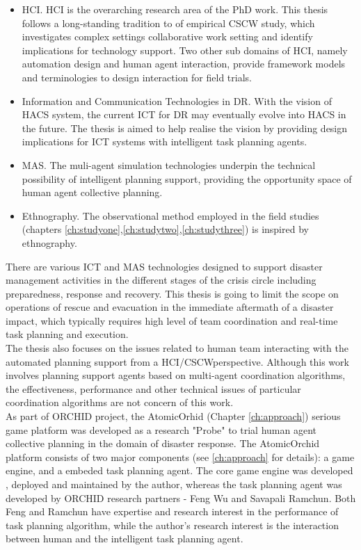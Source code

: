 \begin{itemize} 
  \item \acf{HCI}. \ac{HCI} is the overarching research area of the PhD work. This thesis follows a long-standing tradition to of empirical \ac{CSCW} study, which investigates complex settings collaborative work setting and identify implications for technology support. Two other sub domains of \ac{HCI}, namely automation design and human agent interaction, provide framework models and terminologies to design interaction for field trials.
  \item Information and Communication Technologies in DR. With the vision of \ac{HACS} system, the current ICT for DR may eventually evolve into \ac{HACS} in the future. The thesis is aimed to help realise the vision by providing design implications for \ac{ICT} systems with intelligent task planning agents. 
  \item \acf{MAS}. The muli-agent simulation technologies underpin the technical possibility of intelligent planning support, providing the opportunity space of human agent collective planning. 
  \item Ethnography. The observational method employed in the field studies (chapters \ref{ch:studyone},\ref{ch:studytwo},\ref{ch:studythree}) is inspired by ethnography.
\end{itemize}

There are various \ac{ICT} and \ac{MAS} technologies designed to support disaster management activities in the different stages of the crisis circle including preparedness, response and recovery. This thesis is going to limit the scope on operations of rescue and evacuation in the immediate aftermath of a disaster impact, which typically requires high level of team coordination and real-time task planning and execution.\\ 

The thesis also focuses on the issues related to human team interacting with the automated planning support from a \ac{HCI}/\ac{CSCW}perspective. Although this work involves planning support agents based on multi-agent coordination algorithms, the effectiveness, performance and other technical issues of particular coordination algorithms are not concern of this work.\\

As part of ORCHID project, the AtomicOrhid (Chapter \ref{ch:approach}) serious game platform was developed as a research "Probe" to trial human agent collective planning in the domain of disaster response. The AtomicOrchid platform consists of two major components (see \ref{ch:approach} for details): a game engine, and a embeded task planning agent. The core game engine was developed , deployed and maintained by the author, whereas the task planning agent was developed by ORCHID research partners - Feng Wu and Savapali Ramchun. Both Feng and Ramchun have expertise and research interest in the performance of task planning algorithm, while the author's research interest is the interaction between human and the intelligent task planning agent. \\

